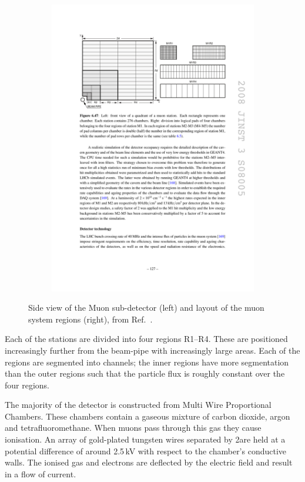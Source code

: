 \begin{figure}[!h]
\begin{subfigure}[m]{0.4\textwidth}
        \includegraphics[width=1.0\textwidth]{figs/Detector/muon_cells_layout.pdf}
    \end{subfigure}
    \caption{Side view of the Muon sub-detector (left) and layout of the muon system regions (right), from Ref.~\cite{Alves:2008zz}.}
    \label{fig:Dec_muon_schematic}   
\end{figure}

Each of the stations are divided into four regions R1--R4. These are positioned increasingly further from the beam-pipe with increasingly large areas. Each of the regions are segmented into channels; the inner regions have more segmentation than the outer regions such that the particle flux is roughly constant over the four regions.   

The majority of the detector is constructed from Multi Wire Proportional Chambers. These chambers contain a gaseous mixture of carbon dioxide, argon and tetrafluoromethane. When muons pass through this gas they cause ionisation. An array of gold-plated tungsten wires separated by 2\mm are held at a potential difference of around 2.5\,kV with respect to the chamber's conductive walls. The ionised gas and electrons are deflected by the electric field and result in a flow of current. 

